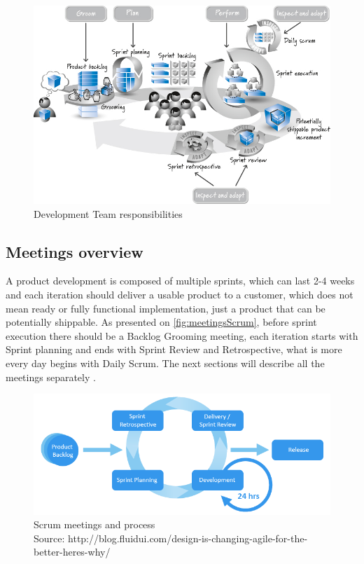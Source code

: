 \begin{figure}[h]
\caption{Development Team responsibilities \cite{ScrumBook}}
\label{fig:devtRes}
\centering
\includegraphics[width=1\textwidth]{img/developmentRes}
\end{figure}

\subsection{Meetings overview}
\label{chap:meetingsOverview}

A product development is composed of multiple sprints, which can last 2-4 weeks \cite{ScrumBook} and each iteration should deliver a usable product to a customer, which does not mean ready or fully functional implementation, just a product that can be potentially shippable. As presented on \autoref{fig:meetingsScrum}, before sprint execution there should be a Backlog Grooming meeting, each iteration starts with Sprint planning and ends with Sprint Review and Retrospective, what is more every day begins with Daily Scrum. The next sections will describe all the meetings separately \cite{ScrumBook}. 

\begin{figure}[h]
\caption{Scrum meetings and process 
\\ Source: http://blog.fluidui.com/design-is-changing-agile-for-the-better-heres-why/}
\label{fig:meetingsScrum}
\centering
\includegraphics[width=1\textwidth]{img/agile-graphic}
\end{figure}

